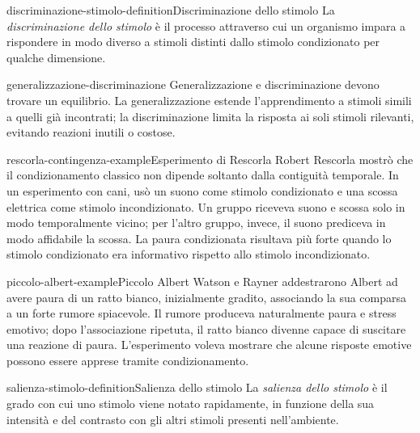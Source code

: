 \documentclass[preview]{standalone}
\begin{document}

\begin{snippetdefinition}{discriminazione-stimolo-definition}{Discriminazione dello stimolo}
    La \emph{discriminazione dello stimolo} è il processo attraverso cui un
    organismo impara a rispondere in modo diverso a stimoli distinti dallo
    stimolo condizionato per qualche dimensione.
\end{snippetdefinition}

\begin{snippet}{generalizzazione-discriminazione}
    Generalizzazione e discriminazione devono trovare un equilibrio. La
    generalizzazione estende l'apprendimento a stimoli simili a quelli già
    incontrati; la discriminazione limita la risposta ai soli stimoli rilevanti,
    evitando reazioni inutili o costose.
\end{snippet}

\begin{snippetexample}{rescorla-contingenza-example}{Esperimento di Rescorla}
    Robert Rescorla mostrò che il condizionamento classico non dipende soltanto
    dalla contiguità temporale. In un esperimento con cani, usò un suono come
    stimolo condizionato e una scossa elettrica come stimolo incondizionato. Un
    gruppo riceveva suono e scossa solo in modo temporalmente vicino; per
    l'altro gruppo, invece, il suono prediceva in modo affidabile la scossa. La
    paura condizionata risultava più forte quando lo stimolo condizionato era
    informativo rispetto allo stimolo incondizionato.
\end{snippetexample}

\begin{snippetexample}{piccolo-albert-example}{Piccolo Albert}
    Watson e Rayner addestrarono Albert ad avere paura di un ratto bianco,
    inizialmente gradito, associando la sua comparsa a un forte rumore
    spiacevole. Il rumore produceva naturalmente paura e stress emotivo; dopo
    l'associazione ripetuta, il ratto bianco divenne capace di suscitare una
    reazione di paura. L'esperimento voleva mostrare che alcune risposte emotive
    possono essere apprese tramite condizionamento.
\end{snippetexample}

\begin{snippetdefinition}{salienza-stimolo-definition}{Salienza dello stimolo}
    La \emph{salienza dello stimolo} è il grado con cui uno stimolo viene
    notato rapidamente, in funzione della sua intensità e del contrasto con gli
    altri stimoli presenti nell'ambiente.
\end{snippetdefinition}
\end{document}
